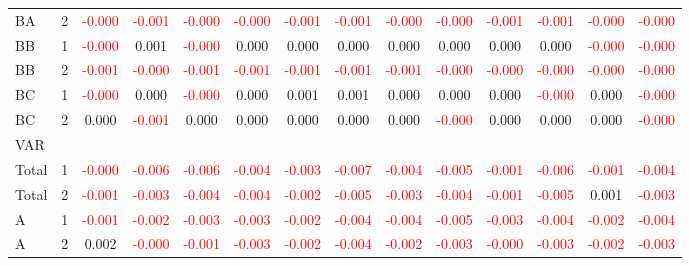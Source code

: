 \begin{table}[!htb]
{\begin{tabular}{llcccccccccccc}
BA & 2 & \textcolor{red}{-0.000} & \textcolor{red}{-0.001} & \textcolor{red}{-0.000} & \textcolor{red}{-0.000} & \textcolor{red}{-0.001} & \textcolor{red}{-0.001} & \textcolor{red}{-0.000} & \textcolor{red}{-0.000} & \textcolor{red}{-0.001} & \textcolor{red}{-0.001} & \textcolor{red}{-0.000} & \textcolor{red}{-0.000}\\
BB & 1 & \textcolor{red}{-0.000} & 0.001 & \textcolor{red}{-0.000} & 0.000 & 0.000 & 0.000 & 0.000 & 0.000 & 0.000 & 0.000 & \textcolor{red}{-0.000} & \textcolor{red}{-0.000}\\
BB & 2 & \textcolor{red}{-0.001} & \textcolor{red}{-0.000} & \textcolor{red}{-0.001} & \textcolor{red}{-0.001} & \textcolor{red}{-0.001} & \textcolor{red}{-0.001} & \textcolor{red}{-0.001} & \textcolor{red}{-0.000} & \textcolor{red}{-0.000} & \textcolor{red}{-0.000} & \textcolor{red}{-0.000} & \textcolor{red}{-0.000}\\
BC & 1 & \textcolor{red}{-0.000} & 0.000 & \textcolor{red}{-0.000} & 0.000 & 0.001 & 0.001 & 0.000 & 0.000 & 0.000 & \textcolor{red}{-0.000} & 0.000 & \textcolor{red}{-0.000}\\
BC & 2 & 0.000 & \textcolor{red}{-0.001} & 0.000 & 0.000 & 0.000 & 0.000 & 0.000 & \textcolor{red}{-0.000} & 0.000 & 0.000 & 0.000 & \textcolor{red}{-0.000}\\
\hline
VAR &  &  &  &  &  &  &  &  &  &  &  &  & \\
\hline
Total & 1 & \textcolor{red}{-0.000} & \textcolor{red}{-0.006} & \textcolor{red}{-0.006} & \textcolor{red}{-0.004} & \textcolor{red}{-0.003} & \textcolor{red}{-0.007} & \textcolor{red}{-0.004} & \textcolor{red}{-0.005} & \textcolor{red}{-0.001} & \textcolor{red}{-0.006} & \textcolor{red}{-0.001} & \textcolor{red}{-0.004}\\
Total & 2 & \textcolor{red}{-0.001} & \textcolor{red}{-0.003} & \textcolor{red}{-0.004} & \textcolor{red}{-0.004} & \textcolor{red}{-0.002} & \textcolor{red}{-0.005} & \textcolor{red}{-0.003} & \textcolor{red}{-0.004} & \textcolor{red}{-0.001} & \textcolor{red}{-0.005} & 0.001 & \textcolor{red}{-0.003}\\
A & 1 & \textcolor{red}{-0.001} & \textcolor{red}{-0.002} & \textcolor{red}{-0.003} & \textcolor{red}{-0.003} & \textcolor{red}{-0.002} & \textcolor{red}{-0.004} & \textcolor{red}{-0.004} & \textcolor{red}{-0.005} & \textcolor{red}{-0.003} & \textcolor{red}{-0.004} & \textcolor{red}{-0.002} & \textcolor{red}{-0.004}\\
A & 2 & 0.002 & \textcolor{red}{-0.000} & \textcolor{red}{-0.001} & \textcolor{red}{-0.003} & \textcolor{red}{-0.002} & \textcolor{red}{-0.004} & \textcolor{red}{-0.002} & \textcolor{red}{-0.003} & \textcolor{red}{-0.000} & \textcolor{red}{-0.003} & \textcolor{red}{-0.002} & \textcolor{red}{-0.003}\\

\end{tabular}}
\end{table}
